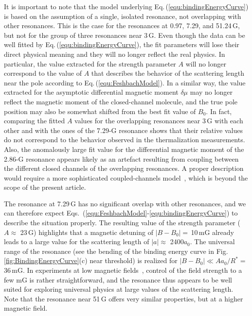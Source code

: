 It is important to note that the model underlying Eq.\,(\ref{equ:bindingEnergyCurve}) is based on the assumption of a single, isolated resonance, not overlapping with other resonances. This is the case for the resonances at 0.97, 7.29, and 51.24\,G, but not for the group of three resonances near 3\,G. Even though the data can be well fitted by Eq.\,(\ref{equ:bindingEnergyCurve}), the fit parameters will lose their direct physical meaning and they will no longer reflect the real physics. In particular, the value extracted for the strength parameter $A$ will no longer correspond to the value of $A$ that describes the behavior of the scattering length near the pole according to Eq.\,(\ref{equ:FeshbachModel}). In a similar way, the value extracted for the asymptotic differential magnetic moment $\delta \mu$ may no longer reflect the magnetic moment of the closed-channel molecule, and the true pole position may also be somewhat shifted from the best fit value of $B_0$. In fact, comparing the fitted $A$ values for the overlapping resonances near 3\,G with each other and with the ones of the 7.29-G resonance shows that their relative values do not correspond to the behavior observed in the thermalization measurements. Also, the anomalously large fit value for the differential magnetic moment of the 2.86-G resonance appears likely as an artefact resulting from coupling between the different closed channels of the overlapping resonances. A proper description would require a more sophisticated coupled-channels model~\cite{Yudkin2021esf,Li2022erp}, which is beyond the scope of the present article.

The resonance at 7.29\,G has no significant overlap with other resonances, and we can therefore expect Eqs.~(\ref{equ:FeshbachModel}-\ref{equ:bindingEnergyCurve}) to describe the situation properly. The resulting value of the strength parameter (${A\approx }$ 23\,G) highlights that a magnetic detuning of $|B-B_0| =$\,10\,mG already leads to a large value for the scattering length of $|a|\approx$ 2400$a_0$. The universal range of the resonance (see the bending of the binding energy curve in Fig.\,\ref{fig:BindingEnergyCurve}(c) near threshold) is realized for $|B-B_0|\ll A a_0 / R^* =$ 36\,mG. In experiments at low magnetic fields~\cite{Soave2022lff}, control of the field strength to a few mG is rather straightforward, and the resonance thus appears to be well suited for exploring universal physics at large values of the scattering length. Note that the resonance near 51\,G offers very similar properties, but at a higher magnetic field.


